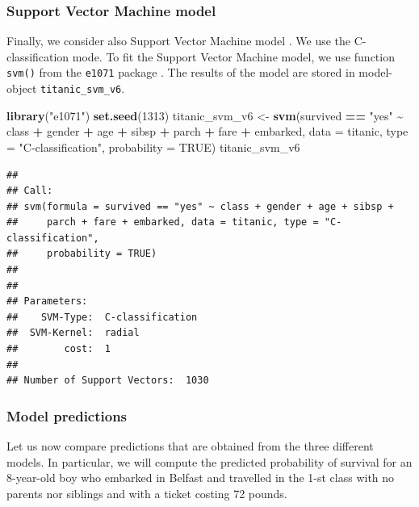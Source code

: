 \documentclass[12pt,]{krantz}
\newenvironment{Shaded}{\begin{snugshade}}{\end{snugshade}}
\newcommand{\DataTypeTok}[1]{\textcolor[rgb]{0.13,0.29,0.53}{#1}}
\newcommand{\DecValTok}[1]{\textcolor[rgb]{0.00,0.00,0.81}{#1}}
\newcommand{\KeywordTok}[1]{\textcolor[rgb]{0.13,0.29,0.53}{\textbf{#1}}}
\newcommand{\NormalTok}[1]{#1}
\newcommand{\OperatorTok}[1]{\textcolor[rgb]{0.81,0.36,0.00}{\textbf{#1}}}
\newcommand{\OtherTok}[1]{\textcolor[rgb]{0.56,0.35,0.01}{#1}}
\newcommand{\StringTok}[1]{\textcolor[rgb]{0.31,0.60,0.02}{#1}}
\begin{document}
\hypertarget{model-titanic-svm}{%
\subsubsection{Support Vector Machine model}\label{model-titanic-svm}}

Finally, we consider also Support Vector Machine model \citep{svm95vapnik}. We use the C-classification mode. To fit the Support Vector Machine model, we use function \texttt{svm()} from the \texttt{e1071} package \citep{e1071}. The results of the model are stored in model-object \texttt{titanic\_svm\_v6}.

\begin{Shaded}
\begin{Highlighting}[]
\KeywordTok{library}\NormalTok{(}\StringTok{"e1071"}\NormalTok{)}
\KeywordTok{set.seed}\NormalTok{(}\DecValTok{1313}\NormalTok{)}
\NormalTok{titanic\_svm\_v6 \textless{}{-}}\StringTok{ }\KeywordTok{svm}\NormalTok{(survived }\OperatorTok{==}\StringTok{ "yes"} \OperatorTok{\textasciitilde{}}\StringTok{ }\NormalTok{class }\OperatorTok{+}\StringTok{ }\NormalTok{gender }\OperatorTok{+}\StringTok{ }\NormalTok{age }\OperatorTok{+}\StringTok{ }\NormalTok{sibsp }\OperatorTok{+}
\StringTok{                             }\NormalTok{parch }\OperatorTok{+}\StringTok{ }\NormalTok{fare }\OperatorTok{+}\StringTok{ }\NormalTok{embarked, }\DataTypeTok{data =}\NormalTok{ titanic, }
                           \DataTypeTok{type =} \StringTok{"C{-}classification"}\NormalTok{, }\DataTypeTok{probability =} \OtherTok{TRUE}\NormalTok{)}
\NormalTok{titanic\_svm\_v6}
\end{Highlighting}
\end{Shaded}

\begin{verbatim}
## 
## Call:
## svm(formula = survived == "yes" ~ class + gender + age + sibsp + 
##     parch + fare + embarked, data = titanic, type = "C-classification", 
##     probability = TRUE)
## 
## 
## Parameters:
##    SVM-Type:  C-classification 
##  SVM-Kernel:  radial 
##        cost:  1 
## 
## Number of Support Vectors:  1030
\end{verbatim}

\hypertarget{predictions-titanic}{%
\subsubsection{Model predictions}\label{predictions-titanic}}

Let us now compare predictions that are obtained from the three different models. In particular, we will compute the predicted probability of survival for an 8-year-old boy who embarked in Belfast and travelled in the 1-st class with no parents nor siblings and with a ticket costing 72 pounds.
\end{document}
